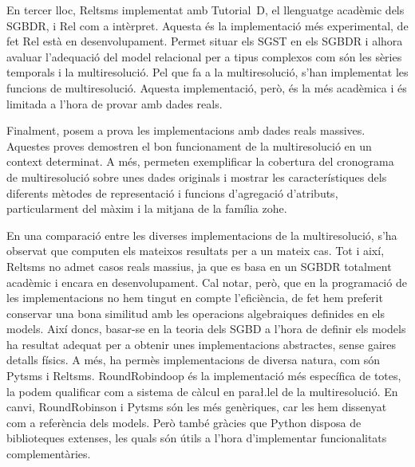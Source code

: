 En tercer lloc, Reltsms implementat amb Tutorial~D, el llenguatge
acadèmic dels \gls{SGBDR}, i Rel com a intèrpret.  Aquesta és la
implementació més experimental, de fet Rel està en desenvolupament.
Permet situar els \gls{SGST} en els \gls{SGBDR} i alhora avaluar
l'adequació del model relacional per a tipus complexos com són les
sèries temporals i la multiresolució.  Pel que fa a la multiresolució,
s'han implementat les funcions de multiresolució. Aquesta
implementació, però, és la més acadèmica i és limitada a l'hora de
provar amb dades reals.



Finalment, posem a prova les implementacions amb dades reals massives.
Aquestes proves demostren el bon funcionament de la multiresolució en
un context determinat. A més, permeten exemplificar la cobertura del
cronograma de multiresolució sobre unes dades originals i mostrar les
característiques dels diferents mètodes de representació i funcions
d'agregació d'atributs, particularment del màxim i la mitjana de la
família \gls{zohe}.




En una comparació entre les diverses implementacions de la
multiresolució, s'ha observat que computen els mateixos resultats per
a un mateix cas. Tot i així, Reltsms no admet casos reals massius, ja que
es basa en un \gls{SGBDR} totalment acadèmic i encara en
desenvolupament.  Cal notar, però, que en la programació de les
implementacions no hem tingut en compte l'eficiència, de fet hem
preferit conservar una bona similitud amb les operacions algebraiques
definides en els models.
%
Així doncs, basar-se en la teoria dels \gls{SGBD} a l'hora de definir
els models ha resultat adequat per a obtenir unes implementacions
abstractes, sense gaires detalls físics.  A més, ha permès
implementacions de diversa natura, com són Pytsms i Reltsms.
RoundRobindoop és la implementació més específica de totes, la podem
qualificar com a sistema de càlcul en para\l.lel de la
multiresolució. En canvi, RoundRobinson i Pytsms són les més
genèriques, car les hem dissenyat com a referència dels models. Però
també gràcies que Python disposa de biblioteques extenses, les quals
són útils a l'hora d'implementar funcionalitats complementàries.



